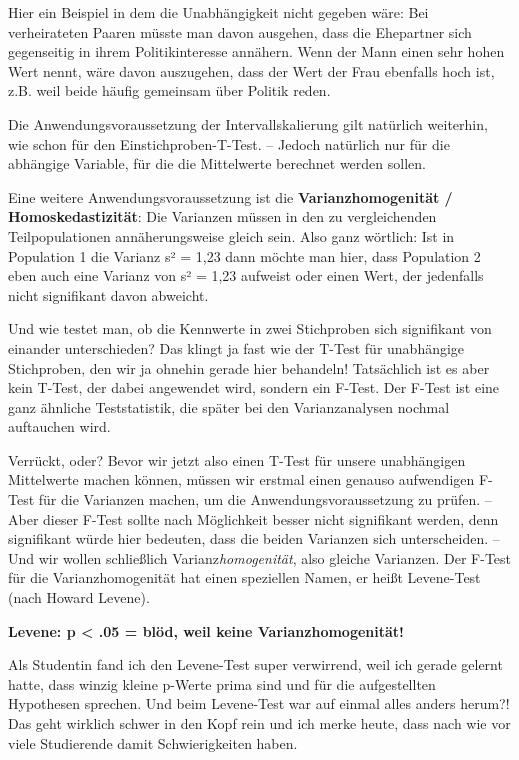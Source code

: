 \documentclass[
]{book}
\begin{document}
Hier ein Beispiel in dem die Unabhängigkeit nicht gegeben wäre: Bei verheirateten Paaren müsste man davon ausgehen, dass die Ehepartner sich gegenseitig in ihrem Politikinteresse annähern. Wenn der Mann einen sehr hohen Wert nennt, wäre davon auszugehen, dass der Wert der Frau ebenfalls hoch ist, z.B. weil beide häufig gemeinsam über Politik reden.

Die Anwendungsvoraussetzung der Intervallskalierung gilt natürlich weiterhin, wie schon für den Einstichproben-T-Test. -- Jedoch natürlich nur für die abhängige Variable, für die die Mittelwerte berechnet werden sollen.

Eine weitere Anwendungsvoraussetzung ist die \textbf{Varianzhomogenität / Homoskedastizität}: Die Varianzen müssen in den zu vergleichenden Teilpopulationen annäherungsweise gleich sein. Also ganz wörtlich: Ist in Population 1 die Varianz s² = 1,23 dann möchte man hier, dass Population 2 eben auch eine Varianz von s² = 1,23 aufweist oder einen Wert, der jedenfalls nicht signifikant davon abweicht.

Und wie testet man, ob die Kennwerte in zwei Stichproben sich signifikant von einander unterschieden? Das klingt ja fast wie der T-Test für unabhängige Stichproben, den wir ja ohnehin gerade hier behandeln! Tatsächlich ist es aber kein T-Test, der dabei angewendet wird, sondern ein F-Test. Der F-Test ist eine ganz ähnliche Teststatistik, die später bei den Varianzanalysen nochmal auftauchen wird.

Verrückt, oder? Bevor wir jetzt also einen T-Test für unsere unabhängigen Mittelwerte machen können, müssen wir erstmal einen genauso aufwendigen F-Test für die Varianzen machen, um die Anwendungsvoraussetzung zu prüfen. -- Aber dieser F-Test sollte nach Möglichkeit besser nicht signifikant werden, denn signifikant würde hier bedeuten, dass die beiden Varianzen sich unterscheiden. -- Und wir wollen schließlich Varianz\emph{homogenität}, also gleiche Varianzen. Der F-Test für die Varianzhomogenität hat einen speziellen Namen, er heißt Levene-Test (nach Howard Levene).

\leavevmode\hypertarget{danger_levene}{}%
\textbf{Levene: p \textless{} .05 = blöd, weil keine Varianzhomogenität!}

Als Studentin fand ich den Levene-Test super verwirrend, weil ich gerade gelernt hatte, dass winzig kleine p-Werte prima sind und für die aufgestellten Hypothesen sprechen. Und beim Levene-Test war auf einmal alles anders herum?! Das geht wirklich schwer in den Kopf rein und ich merke heute, dass nach wie vor viele Studierende damit Schwierigkeiten haben.
\end{document}
